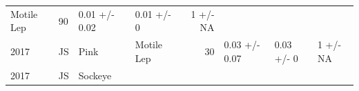 \documentclass[fleqn,10pt]{wlpeerj} %
\begin{document}
\begin{longtable}[]{@{}llllrlll@{}}
\begin{minipage}[t]{0.11\columnwidth}
Motile Lep\strut
\end{minipage} & \begin{minipage}[t]{0.04\columnwidth}\raggedleft\strut
90\strut
\end{minipage} & \begin{minipage}[t]{0.14\columnwidth}\raggedright\strut
0.01 +/- 0.02\strut
\end{minipage} & \begin{minipage}[t]{0.14\columnwidth}\raggedright\strut
0.01 +/- 0\strut
\end{minipage} & \begin{minipage}[t]{0.14\columnwidth}\raggedright\strut
1 +/- NA\strut
\end{minipage}\tabularnewline
\begin{minipage}[t]{0.09\columnwidth}\raggedright\strut
2017\strut
\end{minipage} & \begin{minipage}[t]{0.06\columnwidth}\raggedright\strut
JS\strut
\end{minipage} & \begin{minipage}[t]{0.06\columnwidth}\raggedright\strut
Pink\strut
\end{minipage} & \begin{minipage}[t]{0.11\columnwidth}\raggedright\strut
Motile Lep\strut
\end{minipage} & \begin{minipage}[t]{0.04\columnwidth}\raggedleft\strut
30\strut
\end{minipage} & \begin{minipage}[t]{0.14\columnwidth}\raggedright\strut
0.03 +/- 0.07\strut
\end{minipage} & \begin{minipage}[t]{0.14\columnwidth}\raggedright\strut
0.03 +/- 0\strut
\end{minipage} & \begin{minipage}[t]{0.14\columnwidth}\raggedright\strut
1 +/- NA\strut
\end{minipage}\tabularnewline
\begin{minipage}[t]{0.09\columnwidth}\raggedright\strut
2017\strut
\end{minipage} & \begin{minipage}[t]{0.06\columnwidth}\raggedright\strut
JS\strut
\end{minipage} & \begin{minipage}[t]{0.06\columnwidth}\raggedright\strut
Sockeye\strut
\end{minipage} & \begin{minipage}[t]{0.11\columnwidth}\raggedright\strut

\end{minipage}
\end{longtable}
\end{document}
